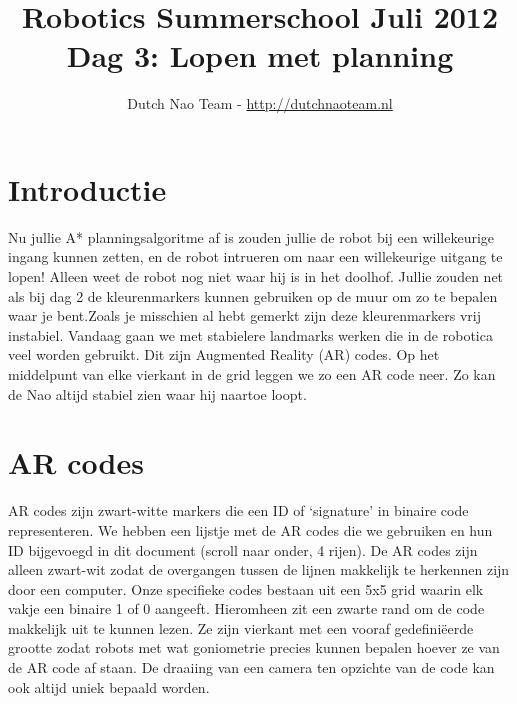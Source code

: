 \documentclass[a4paper]{article}
\title{\textbf{Robotics Summerschool Juli 2012} \\ Dag 3: Lopen met planning }
\author{Dutch Nao Team - \url{http://dutchnaoteam.nl}}
\date{}
\begin{document}
\maketitle

\section{Introductie}

Nu jullie A* planningsalgoritme af is zouden jullie de robot bij een willekeurige ingang kunnen zetten, en de robot intrueren om naar een willekeurige uitgang te lopen! Alleen weet de robot nog niet waar hij is in het doolhof. Jullie zouden net als bij dag 2 de kleurenmarkers kunnen gebruiken op de muur om zo te bepalen waar je bent.Zoals je misschien al hebt gemerkt zijn deze kleurenmarkers vrij instabiel. Vandaag gaan we met stabielere landmarks werken die in de robotica veel worden gebruikt. Dit zijn Augmented Reality (AR) codes. Op het middelpunt van elke vierkant in de grid leggen we zo een AR code neer. Zo kan de Nao altijd stabiel zien waar hij naartoe loopt.

\tableofcontents

\newpage

\section{AR codes}
AR codes zijn zwart-witte markers die een ID of `signature' in binaire code representeren. We hebben een lijstje met de AR codes die we gebruiken en hun ID bijgevoegd in dit document (scroll naar onder, 4 rijen). De AR codes zijn alleen zwart-wit zodat de overgangen tussen de lijnen makkelijk te herkennen zijn door een computer. Onze specifieke codes bestaan uit een 5x5 grid waarin elk vakje een binaire 1 of 0 aangeeft. Hieromheen zit een zwarte rand om de code makkelijk uit te kunnen lezen. Ze zijn vierkant met een vooraf gedefini\"eerde grootte zodat robots met wat goniometrie precies kunnen bepalen hoever ze van de AR code af staan. De draaiing van een camera ten opzichte van de code kan ook altijd uniek bepaald worden.
\end{document}
